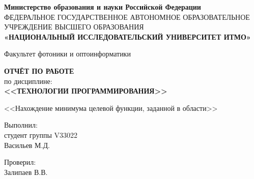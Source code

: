 \thispagestyle{empty}

\begin{center}
    \textbf{Министерство образования и науки Российской Федерации} \\
    ФЕДЕРАЛЬНОЕ ГОСУДАРСТВЕННОЕ АВТОНОМНОЕ ОБРАЗОВАТЕЛЬНОЕ УЧРЕЖДЕНИЕ ВЫСШЕГО ОБРАЗОВАНИЯ \\
    \textbf{\small{«НАЦИОНАЛЬНЫЙ ИССЛЕДОВАТЕЛЬСКИЙ УНИВЕРСИТЕТ ИТМО»}}
    \end{center}
    
\begin{center}
    Факультет фотоники и оптоинформатики
\end{center}

\vspace{0.1\paperheight}

\begin{center}
    \textbf{ОТЧЁТ ПО РАБОТЕ} \\
    по дисциплине: \\
    \textbf{<<ТЕХНОЛОГИИ ПРОГРАММИРОВАНИЯ>>}
\end{center}

\begin{center}
    <<Нахождение минимума целевой функции, заданной в области>>
\end{center}

\vspace{0.1\paperheight}

\begin{flushright}
    Выполнил: \\
    студент группы V33022 \\
    Васильев М.Д.
\end{flushright}

\begin{flushright}
    Проверил: \\
    Залипаев В.В.
\end{flushright}

\vspace{0pt plus4fill}

\newpage